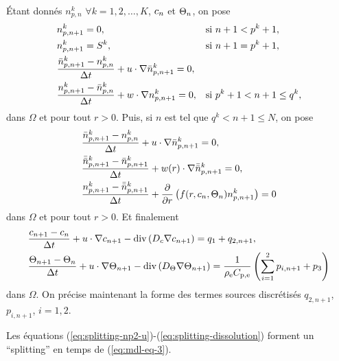 Étant donnés $n_{p,n}^k$ $\forall k=1, 2, \dots, K$,
$c_n$ et $\Theta_n$, on pose
\begin{align}
  & n_{p,n+1}^k = 0, &&\text{si }  n + 1 < p^k + 1,\label{eq:splitting-np1-init}\\
  & n_{p,n+1}^k = S^k, &&\text{si } n + 1 = p^k + 1,\\
  & \frac{\bar n_{p,n+1}^k - n_{p,n}^k}{\Delta t} + u\cdot\nabla \bar n_{p,n+1}^k = 0,\\
  & \frac{n_{p,n+1}^k - \bar n_{p,n}^k}{\Delta t} + w\cdot\nabla n_{p,n+1}^k = 0, && \text{si } p^k + 1 < n+1 \leq q^k,\label{eq:splitting-np1-u}
\end{align}
dans $\Omega$ et pour tout $r > 0$. Puis, si $n$ est tel que $q^k < n
+ 1 \leq N$, on pose
\begin{align}
  &\displaystyle\frac{\bar n_{p,n+1}^k - n_{p,n}^k}{\Delta t} +
  u\cdot\nabla \bar n_{p,n+1}^k = 0,\label{eq:splitting-np2-u}\\
  &\displaystyle\frac{\bar{\bar n}_{p,n+1}^k - \bar n_{p,n+1}^k}{\Delta t} +
  w(r)\cdot\nabla \bar{\bar n}_{p,n+1}^k = 0,\label{eq:splitting-np2-w}\\
    &\displaystyle\frac{n_{p,n+1}^k - \bar{\bar n}_{p,n+1}^k}{\Delta t} +
    \displaystyle\frac{\partial}{\partial r}\left( f(r,
      c_n, \Theta_n)n_{p,n+1}^k \right) =
    0\label{eq:splitting-dissolution}
\end{align}
dans $\Omega$ et pour tout $r > 0$. Et finalement
\begin{align}
&\frac{c_{n+1} - c_{n}}{\Delta t} + u\cdot\nabla
c_{n+1} - \mathrm{div}\left( D_c \nabla c_{n+1} \right) = q_1
+ q_{2,n+1},\label{eq:splitting-c} \\
&\frac{\Theta_{n+1} - \Theta_{n}}{\Delta t} + u\cdot\nabla
\Theta_{n+1} - \mathrm{div}\left( D_\Theta \nabla \Theta_{n+1} \right) =
\frac{1}{\rho_\mathrm{e} C_{\mathrm{p,e}}}\left( \sum_{i =
    1}^2p_{i,n+1} + p_3 \right)\label{eq:splitting-t}
\end{align}
dans $\Omega$. On précise maintenant la forme des termes sources
discrétisés $q_{2,n+1}$, $p_{i,n+1}$, $i = 1,2$.

\begin{remarque}
Les équations (\ref{eq:splitting-np2-u})-(\ref{eq:splitting-dissolution}) forment un ``splitting'' en
temps de (\ref{eq:mdl-eq-3}).
\end{remarque}

